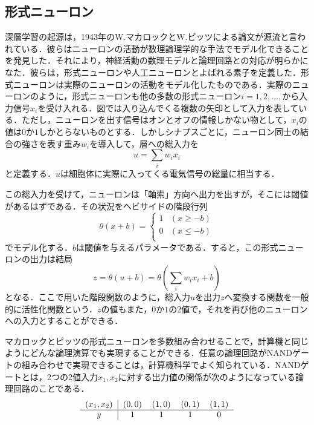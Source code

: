 \documentclass[a4paper,11pt]{jsreport}
\begin{document}
\subsection{形式ニューロン}
深層学習の起源は，1943年のW.マカロックとW.ピッツによる論文が源流と言われている．彼らはニューロンの活動が数理論理学的な手法でモデル化できることを発見した．それにより，神経活動の数理モデルと論理回路との対応が明らかになた．彼らは，形式ニューロンや人工ニューロンとよばれる素子を定義した．形式ニューロンは実際のニューロンの活動をモデル化したものである．実際のニューロンのように，形式ニューロンも他の多数の形式ニューロン$i=1,2,\dots,$から入力信号$x_i$を受け入れる．図では入り込んでくる複数の矢印として入力を表している．ただし，ニューロンを出す信号はオンとオフの情報しかない物として，$x_i$の値は$0$か$1$しかとらないものとする．しかしシナプスごとに，ニューロン同士の結合の強さを表す重み$w_i$を導入して，層への総入力を
\begin{equation}
  u = \sum_{i} w_i x_i
\end{equation}
と定義する．$u$は細胞体に実際に入ってくる電気信号の総量に相当する．\par
この総入力を受けて，ニューロンは「軸索」方向へ出力を出すが，そこには閾値があるはずである．その状況をヘビサイドの階段行列
\begin{equation}
  \theta(x+b) = \begin{cases}
    1 & (x \geq -b) \\
    0 & (x \leq -b) \\
  \end{cases}
\end{equation}
でモデル化する．$b$は閾値を与えるパラメータである．すると，この形式ニューロンの出力は結局
\begin{equation}
  z = \theta(u + b) = \theta\left( \sum_{i} w_i x_i + b \right)
\end{equation}
となる．ここで用いた階段関数のように，総入力$u$を出力$z$へ変換する関数を一般的に活性化関数という．$z$の値もまた，$0$か$1$の2値で，それを再び他のニューロンへの入力とすることができる．\par
マカロックとピッツの形式ニューロンを多数組み合わせることで，計算機と同じようにどんな論理演算でも実現することができる．任意の論理回路がNANDゲートの組み合わせで実現できることは，計算機科学でよく知られている．NANDゲートとは，2つの2値入力$x_1, x_2$に対する出力値の関係が次のようになっている論理回路のことである．
\begin{equation*}
  \begin{tabular}{c|cccc}
    $(x_1, x_2)$ & $(0,0)$ & $(1,0)$ & $(0,1)$ & $(1,1)$ \\ \hline
    $y$          & $1$     & $1$     & $1$     & $0$     \\
  \end{tabular}
\end{equation*}
\end{document}
